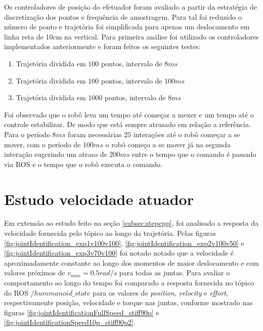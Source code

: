 
Os controladores de posição do efetuador foram avaliado a partir da estratégia de discretização dos pontos e frequência de amostragem. Para tal foi reduzido o número de ponto e trajetória foi simplificada para apenas um deslocamento em linha reta de 10cm na vertical. Para primeira análise foi utilizado os controladores implementados anteriormente e foram feitos os seguintes testes:

\begin{enumerate}
    \item Trajetória dividida em $100$ pontos, intervalo de $8 ms$
    \item Trajetória dividida em $100$ pontos, intervalo de $100 ms$
    \item Trajetória dividida em $1000$ pontos, intervalo de $8 ms$
\end{enumerate}

Foi observado que o robô leva um tempo até começar a mexer e um tempo até o controle estabilizar. De modo que está sempre atrasado em relação a referência. Para o período $8 ms$ foram necessárias $25$ interações até o robô começar a se mover, com o período de $100 ms$ o robô começo a se mover já na segunda interação sugerindo um atraso de $200 ms$ entre o tempo que o comando é passado via ROS e o tempo que o robô executa o comando.



\section{Estudo velocidade atuador}

Em extensão ao estudo feito na seção \ref{subsec:stepcpp}, foi analisado a resposta da velocidade fornecida pelo tópico ao longo da trajetória. Pelas figuras \ref{fig:jointIdentification_exp1v100v100}, \ref{fig:jointIdentification_exp2v100v50} e \ref{fig:jointIdentification_exp3v70v100} foi notado notado que a velocidade é aproximadamente constante ao longo dos momentos de maior deslocamento e com valores próximos de $v_{max} = 0.5 rad/s$ para todas as juntas. Para avaliar o comportamento ao longo do tempo foi comparado a resposta fornecida no tópico do ROS $/hummanoid\_state$ para os valores de \textit{position}, \textit{velocity} e \textit{effort}, respectivamente posição, velocidade e torque nas juntas, conforme mostrado nas figuras \ref{fig:jointIdentificationFullSpeed_stiff90p} e \ref{fig:jointIdentificationSpeed10p_stiff90p2}.

